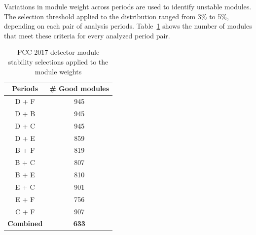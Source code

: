 Variations in module weight across periods are used to identify unstable modules. The selection threshold applied to the distribution ranged from 3\% to 5\%, depending on each pair of analysis periods. Table~\ref{tab:pcc_2017_module_selections} shows the number of modules that meet these criteria for every analyzed period pair.

\begin{table}[h]
    \caption{PCC 2017 detector module stability selections applied to the module weights}
    \label{tab:pcc_2017_module_selections}
  \begin{center}
    \begin{tabular}{cc}  
    \textbf{Periods}   & \textbf{\# Good modules} \\ \hline
     D + F      & 945           \\ 
     D + B      & 945           \\ 
     D + C      & 945           \\ 
     D + E      & 859           \\ 
     B + F      & 819          \\ 
     B + C      & 807          \\ 
     B + E      & 810          \\ 
     E + C      & 901          \\ 
     E + F      & 756          \\ 
     C + F      & 907          \\ \hline
     \textbf{Combined}   & \textbf{633}  \\ \hline
      \end{tabular}
  \end{center}
\end{table}



